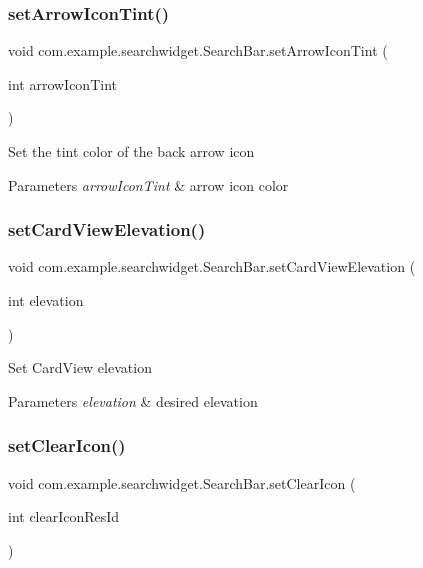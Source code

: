 \subsubsection{\texorpdfstring{setArrowIconTint()}{setArrowIconTint()}}
{\footnotesize\ttfamily void com.\+example.\+searchwidget.\+Search\+Bar.\+set\+Arrow\+Icon\+Tint (\begin{DoxyParamCaption}\item[{int}]{arrow\+Icon\+Tint }\end{DoxyParamCaption})}

Set the tint color of the back arrow icon


\begin{DoxyParams}{Parameters}
{\em arrow\+Icon\+Tint} & arrow icon color \\
\hline
\end{DoxyParams}
\mbox{\label{classcom_1_1example_1_1searchwidget_1_1_search_bar_af60f6509efc9ca6466b54e46bd3a5709}} 
\subsubsection{\texorpdfstring{setCardViewElevation()}{setCardViewElevation()}}
{\footnotesize\ttfamily void com.\+example.\+searchwidget.\+Search\+Bar.\+set\+Card\+View\+Elevation (\begin{DoxyParamCaption}\item[{int}]{elevation }\end{DoxyParamCaption})}

Set Card\+View elevation


\begin{DoxyParams}{Parameters}
{\em elevation} & desired elevation \\
\hline
\end{DoxyParams}
\mbox{\label{classcom_1_1example_1_1searchwidget_1_1_search_bar_a26dd3ac06416bc0d666d2ce792656c05}} 
\subsubsection{\texorpdfstring{setClearIcon()}{setClearIcon()}}
{\footnotesize\ttfamily void com.\+example.\+searchwidget.\+Search\+Bar.\+set\+Clear\+Icon (\begin{DoxyParamCaption}\item[{int}]{clear\+Icon\+Res\+Id }\end{DoxyParamCaption})}


